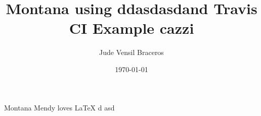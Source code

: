 \documentclass{article}
\title{Montana using  ddasdasdand Travis CI Example cazzi}
\author{Jude Vensil Braceros}
\date{\today}
\begin{document}
\maketitle

Montana Mendy loves LaTeX d asd
\end{document}
